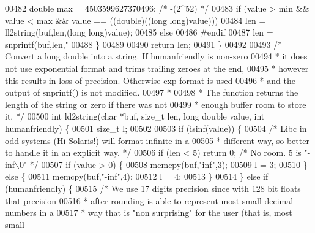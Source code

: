 \begin{DoxyCode}
00482         \textcolor{keywordtype}{double} max = 4503599627370496; \textcolor{comment}{/* -(2^52) */}
00483         \textcolor{keywordflow}{if} (value > min && value < max && value == ((\textcolor{keywordtype}{double})((\textcolor{keywordtype}{long} \textcolor{keywordtype}{long})value)))
00484             len = ll2string(buf,len,(\textcolor{keywordtype}{long} \textcolor{keywordtype}{long})value);
00485         \textcolor{keywordflow}{else}
00486 \textcolor{preprocessor}{#}\textcolor{preprocessor}{endif}
00487             len = snprintf(buf,len,\textcolor{stringliteral}{"%
00488     \}
00489 
00490     \textcolor{keywordflow}{return} len;
00491 \}
00492 
00493 \textcolor{comment}{/* Convert a long double into a string. If humanfriendly is non-zero}
00494 \textcolor{comment}{ * it does not use exponential format and trims trailing zeroes at the end,}
00495 \textcolor{comment}{ * however this results in loss of precision. Otherwise exp format is used}
00496 \textcolor{comment}{ * and the output of snprintf() is not modified.}
00497 \textcolor{comment}{ *}
00498 \textcolor{comment}{ * The function returns the length of the string or zero if there was not}
00499 \textcolor{comment}{ * enough buffer room to store it. */}
00500 \textcolor{keywordtype}{int} ld2string(\textcolor{keywordtype}{char} *buf, size\_t len, \textcolor{keywordtype}{long} \textcolor{keywordtype}{double} value, \textcolor{keywordtype}{int} humanfriendly) \{
00501     size\_t l;
00502 
00503     \textcolor{keywordflow}{if} (isinf(value)) \{
00504         \textcolor{comment}{/* Libc in odd systems (Hi Solaris!) will format infinite in a}
00505 \textcolor{comment}{         * different way, so better to handle it in an explicit way. */}
00506         \textcolor{keywordflow}{if} (len < 5) \textcolor{keywordflow}{return} 0; \textcolor{comment}{/* No room. 5 is "-inf\(\backslash\)0" */}
00507         \textcolor{keywordflow}{if} (value > 0) \{
00508             memcpy(buf,\textcolor{stringliteral}{"inf"},3);
00509             l = 3;
00510         \} \textcolor{keywordflow}{else} \{
00511             memcpy(buf,\textcolor{stringliteral}{"-inf"},4);
00512             l = 4;
00513         \}
00514     \} \textcolor{keywordflow}{else} \textcolor{keywordflow}{if} (humanfriendly) \{
00515         \textcolor{comment}{/* We use 17 digits precision since with 128 bit floats that precision}
00516 \textcolor{comment}{         * after rounding is able to represent most small decimal numbers in a}
00517 \textcolor{comment}{         * way that is "non surprising" for the user (that is, most small}
}
\end{DoxyCode}
